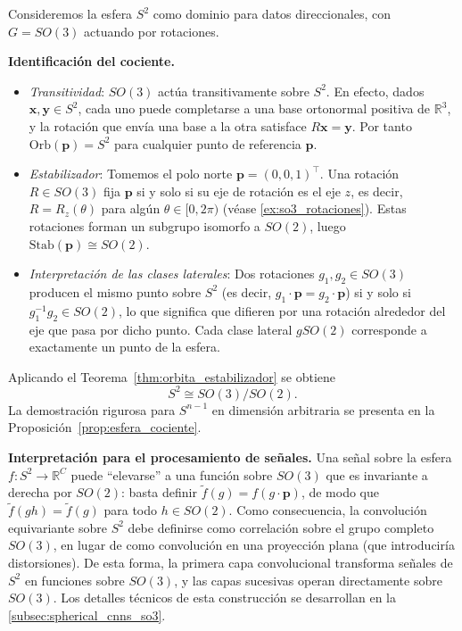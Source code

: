 \begin{example}\label{ex:aplicacion_teorema_gdl}
Consideremos la esfera $S^2$ como dominio para datos direccionales, con $G = SO(3)$ actuando por rotaciones.

\textbf{Identificación del cociente.}
\begin{itemize}
    \item \emph{Transitividad}: $SO(3)$ actúa transitivamente sobre $S^2$. En efecto, dados $\mathbf{x}, \mathbf{y} \in S^2$, cada uno puede completarse a una base ortonormal positiva de $\mathbb{R}^3$, y la rotación que envía una base a la otra satisface $R\mathbf{x} = \mathbf{y}$. Por tanto $\mathrm{Orb}(\mathbf{p}) = S^2$ para cualquier punto de referencia $\mathbf{p}$.

    \item \emph{Estabilizador}: Tomemos el polo norte $\mathbf{p} = (0,0,1)^{\!\top}$. Una rotación $R \in SO(3)$ fija $\mathbf{p}$ si y solo si su eje de rotación es el eje $z$, es decir, $R = R_z(\theta)$ para algún $\theta \in [0, 2\pi)$ (véase \autoref{ex:so3_rotaciones}). Estas rotaciones forman un subgrupo isomorfo a $SO(2)$, luego $\mathrm{Stab}(\mathbf{p}) \cong SO(2)$.

    \item \emph{Interpretación de las clases laterales}: Dos rotaciones $g_1, g_2 \in SO(3)$ producen el mismo punto sobre $S^2$ (es decir, $g_1 \cdot \mathbf{p} = g_2 \cdot \mathbf{p}$) si y solo si $g_1^{-1}g_2 \in SO(2)$, lo que significa que difieren por una rotación alrededor del eje que pasa por dicho punto. Cada clase lateral $gSO(2)$ corresponde a exactamente un punto de la esfera.
\end{itemize}
Aplicando el Teorema~\ref{thm:orbita_estabilizador} se obtiene
\begin{equation}\label{eq:esfera_cociente_ejemplo}
    S^2 \cong SO(3)/SO(2).
\end{equation}
La demostración rigurosa para $S^{n-1}$ en dimensión arbitraria se presenta en la Proposición~\ref{prop:esfera_cociente}.

\textbf{Interpretación para el procesamiento de señales.}
Una señal sobre la esfera $f\colon S^2 \to \mathbb{R}^C$ puede ``elevarse'' a una función sobre $SO(3)$ que es invariante a derecha por $SO(2)$: basta definir $\tilde{f}(g) = f(g \cdot \mathbf{p})$, de modo que $\tilde{f}(gh) = \tilde{f}(g)$ para todo $h \in SO(2)$. Como consecuencia, la convolución equivariante sobre $S^2$ debe definirse como correlación sobre el grupo completo $SO(3)$, en lugar de como convolución en una proyección plana (que introduciría distorsiones). De esta forma, la primera capa convolucional transforma señales de $S^2$ en funciones sobre $SO(3)$, y las capas sucesivas operan directamente sobre $SO(3)$. Los detalles técnicos de esta construcción se desarrollan en la \autoref{subsec:spherical_cnns_so3}.


\end{example}
